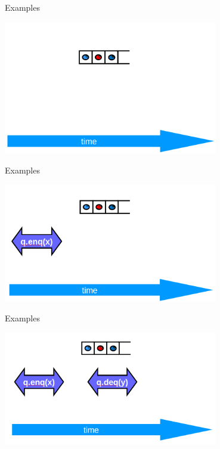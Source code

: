 \begin{frame}{Examples}
\begin{center} \includegraphics[width=0.7\textwidth]{./pics/linear/65.png} \end{center}
\end{frame}

\begin{frame}{Examples}
\begin{center} \includegraphics[width=0.7\textwidth]{./pics/linear/66.png} \end{center}
\end{frame}

\begin{frame}{Examples}
\begin{center} \includegraphics[width=0.7\textwidth]{./pics/linear/67.png} \end{center}
\end{frame}

